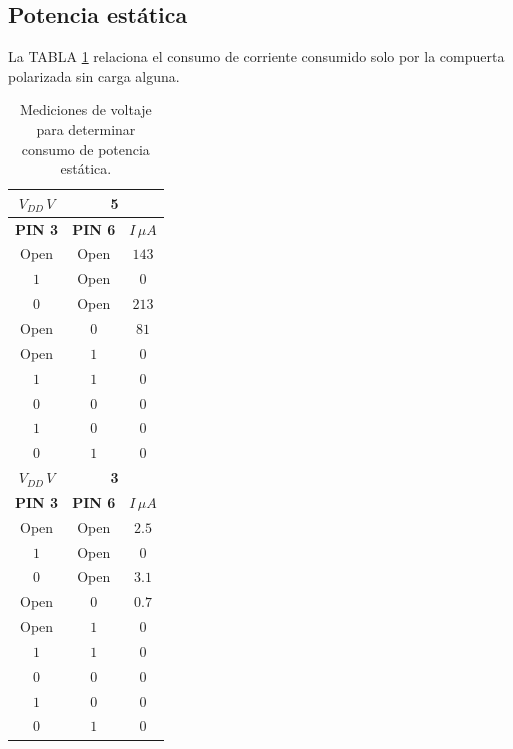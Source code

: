 \documentclass[twocolumn]{IEEEtran}
\begin{document}
\subsection{Potencia estática}
\noindent
La TABLA \ref{tab7} relaciona el consumo de corriente consumido solo por la compuerta polarizada sin carga alguna.
\begin{table}[H]
\centering
  \caption{Mediciones de voltaje para determinar consumo de potencia estática.}
    \begin{tabular}{|c|c|c|}\hline
    $V_{DD}\, V$ & \multicolumn{2}{c|}{\textbf{5}}\\ \hline
    \textbf{PIN 3} & \textbf{PIN 6} & $I\, \mu A$ \\ \hline
    Open & Open & $143$ \\ \hline
    $1$ & Open & $0$ \\ \hline
    $0$ & Open & $213$ \\ \hline
    Open & $0$ & $81$ \\ \hline
    Open & $1$ & $0$ \\ \hline
    $1$ & $1$ & $0$ \\ \hline
    $0$ & $0$ & $0$ \\ \hline
    $1$ & $0$ & $0$ \\ \hline
    $0$ & $1$ & $0$ \\ \hline
    $V_{DD}\, V$ & \multicolumn{2}{c|}{\textbf{3}} \\ \hline
    \textbf{PIN 3} & \textbf{PIN 6} & $I\, \mu A$ \\ \hline
    Open & Open & $2.5$ \\ \hline
    $1$ & Open & $0$ \\ \hline
    $0$ & Open & $3.1$ \\ \hline
    Open & $0$ & $0.7$ \\ \hline
    Open & $1$ & $0$ \\ \hline
    $1$ & $1$ & $0$ \\ \hline
    $0$ & $0$ & $0$ \\ \hline
    $1$ & $0$ & $0$ \\ \hline
    $0$ & $1$ & $0$ \\ \hline
  \end{tabular}
\label{tab7}
\end{table}
\end{document}
